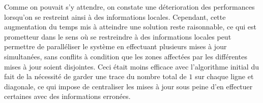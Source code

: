\documentclass[11pt, openany]{article}
\begin{document}
Comme on pouvait s'y attendre, on constate une déterioration des performances lorsqu'on se restreint ainsi à des informations locales. Cependant, cette augmentation du temps mis à atteindre une solution reste raisonnable, ce qui est prometteur dans le sens où se restreindre à des informations locales peut permettre de paralléliser le système en effectuant plusieurs mises à jour simultanées, sans conflits à condition que les zones affectées par les différentes mises à jour soient disjointes. Ceci était moins efficace avec l'algorithme initial du fait de la nécessité de garder une trace du nombre total de $1$ sur chaque ligne et diagonale, ce qui impose de centraliser les mises à jour sous peine d'en effectuer certaines avec des informations erronées.


\nocite{Pom96}
\nocite{BahiC06}
\nocite{Fat13}



\end{document}
